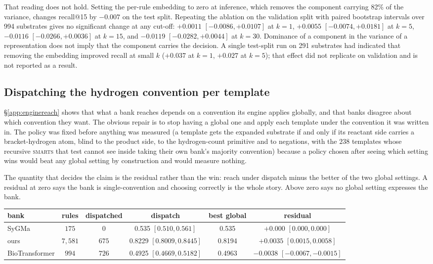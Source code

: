 That reading does not hold. Setting the per-rule embedding to zero at inference, which removes the
component carrying 82\% of the variance, changes recall@15 by $-0.007$ on the test split.
Repeating the ablation on the validation split with paired bootstrap intervals over 994 substrates
gives no significant change at any cut-off: $+0.0011$ $[-0.0086,+0.0107]$ at $k=1$, $+0.0055$
$[-0.0074,+0.0181]$ at $k=5$, $-0.0116$ $[-0.0266,+0.0036]$ at $k=15$, and $-0.0119$
$[-0.0282,+0.0044]$ at $k=30$. Dominance of a component in the variance of a representation does
not imply that the component carries the decision. A single test-split run on 291 substrates had
indicated that removing the embedding improved recall at small $k$ ($+0.037$ at $k=1$,
$+0.027$ at $k=5$); that effect did not replicate on validation and is not reported as a result.

\subsection{Dispatching the hydrogen convention per template}
\label{app:dispatch}

\S\ref{app:enginereach} shows that what a bank reaches depends on a convention its engine applies
globally, and that banks disagree about which convention they want. The obvious repair is to stop
having a global one and apply each template under the convention it was written in. The policy was
fixed before anything was measured (a template gets the expanded substrate if and only if its
reactant side carries a bracket-hydrogen atom, blind to the product side, to the hydrogen-count
primitive and to negations, with the $238$ templates whose recursive \textsc{smarts} that test
cannot see inside taking their own bank's majority convention) because a policy chosen after
seeing which setting wins would beat any global setting by construction and would measure nothing.

The quantity that decides the claim is the residual rather than the win: reach under dispatch minus
the better of the two global settings. A residual at zero says the bank is single-convention and
choosing correctly is the whole story. Above zero says no global setting expresses the bank.

\begin{center}
\small\setlength{\tabcolsep}{4pt}
\begin{tabular}{lccccc}
\toprule
bank & rules & dispatched & dispatch & best global & residual \\
\midrule
SyGMa          & $175$    & $0$   & 0.535 $[0.510,0.561]$ & 0.535 & $+0.000$ $[0.000,0.000]$ \\
ours           & $7{,}581$ & $675$ & 0.8229 $[0.8009,0.8445]$ & 0.8194 & $+0.0035$ $[0.0015,0.0058]$ \\
BioTransformer & $994$    & $726$ & 0.4925 $[0.4669,0.5182]$ & 0.4963 & $-0.0038$ $[-0.0067,-0.0015]$ \\
\bottomrule
\end{tabular}
\end{center}

